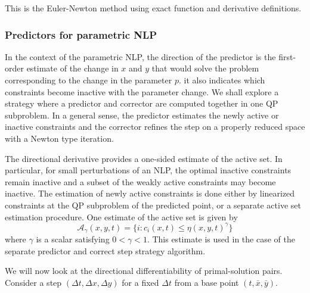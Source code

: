 \documentclass{article}
\theoremstyle{example}
\theoremstyle{definition}
\theoremstyle{assumption}
\theoremstyle{lemma}
\begin{document}
This is the Euler-Newton method using exact function and derivative definitions. 
\subsubsection{Predictors for parametric NLP}
In the context of the parametric NLP, the direction of the predictor is the first-order estimate of the change in $x$ and $y$ that would solve the problem corresponding to the change in the parameter $p$.
it also indicates which constraints become inactive with the parameter change.
We shall explore a strategy where a predictor and corrector are computed together in one QP subproblem.
In a general sense, the predictor estimates the newly active or inactive constraints and the corrector refines the step on a properly reduced space with a Newton type iteration.
\par
The directional derivative provides a one-sided estimate of the active set.
In particular, for small perturbations of an NLP, the optimal inactive constraints remain inactive and a subset of the weakly active constraints may become inactive.
The estimation of newly active constraints is done either by linearized constraints at the QP subproblem of the predicted point, or a separate active set estimation procedure.
One estimate of the active set is given by
\begin{equation}
	\mathcal{A}_\gamma(x,y,t)=\{i:c_i(x,t)\leq\eta(x,y,t)^\gamma\}
\end{equation}
where $\gamma$ is a scalar satisfying $0<\gamma<1$.
This estimate is used in the case of the separate predictor and correct step strategy algorithm.
\par
We will now look at the directional differentiability of primal-solution pairs.
Consider a step $(\Delta t,\Delta x,\Delta y)$ for a fixed $\Delta t$ from a base point $(t,\bar{x},\bar{y})$.
\end{document}
